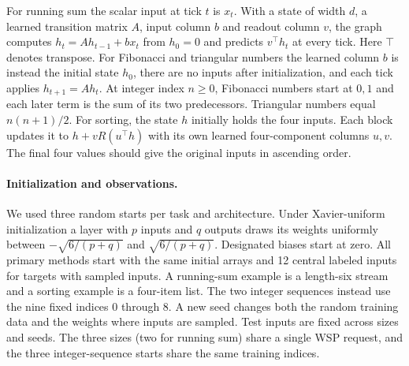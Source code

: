 For running sum the scalar input at tick $t$ is $x_t$. With a state of width $d$, a learned transition matrix $A$, input column $b$ and readout column $v$, the graph computes $h_t=Ah_{t-1}+b x_t$ from $h_0=0$ and predicts $v^\top h_t$ at every tick. Here $\top$ denotes transpose. For Fibonacci and triangular numbers the learned column $b$ is instead the initial state $h_0$, there are no inputs after initialization, and each tick applies $h_{t+1}=Ah_t$. At integer index $n\ge0$, Fibonacci numbers start at $0,1$ and each later term is the sum of its two predecessors. Triangular numbers equal $n(n+1)/2$. For sorting, the state $h$ initially holds the four inputs. Each block updates it to $h+vR(u^\top h)$ with its own learned four-component columns $u,v$. The final four values should give the original inputs in ascending order.



\paragraph{Initialization and observations.}
We used three random starts per task and architecture. Under Xavier-uniform initialization a layer with $p$ inputs and $q$ outputs draws its weights uniformly between $-\sqrt{6/(p+q)}$ and $\sqrt{6/(p+q)}$. Designated biases start at zero. All primary methods start with the same initial arrays and 12 central labeled inputs for targets with sampled inputs. A running-sum example is a length-six stream and a sorting example is a four-item list. The two integer sequences instead use the nine fixed indices 0 through 8. A new seed changes both the random training data and the weights where inputs are sampled. Test inputs are fixed across sizes and seeds. The three sizes (two for running sum) share a single WSP request, and the three integer-sequence starts share the same training indices.

